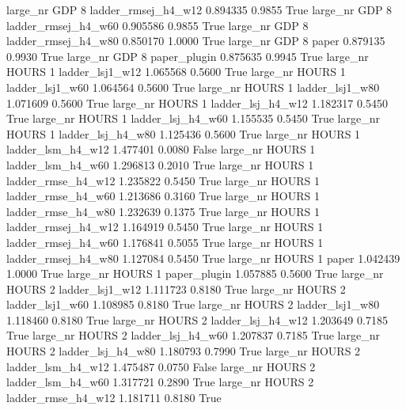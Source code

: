   large_nr      GDP                 8 ladder_rmsej_h4_w12   0.894335      0.9855    True
  large_nr      GDP                 8 ladder_rmsej_h4_w60   0.905586      0.9855    True
  large_nr      GDP                 8 ladder_rmsej_h4_w80   0.850170      1.0000    True
  large_nr      GDP                 8               paper   0.879135      0.9930    True
  large_nr      GDP                 8        paper_plugin   0.875635      0.9945    True
  large_nr    HOURS                 1     ladder_lsj1_w12   1.065568      0.5600    True
  large_nr    HOURS                 1     ladder_lsj1_w60   1.064564      0.5600    True
  large_nr    HOURS                 1     ladder_lsj1_w80   1.071609      0.5600    True
  large_nr    HOURS                 1   ladder_lsj_h4_w12   1.182317      0.5450    True
  large_nr    HOURS                 1   ladder_lsj_h4_w60   1.155535      0.5450    True
  large_nr    HOURS                 1   ladder_lsj_h4_w80   1.125436      0.5600    True
  large_nr    HOURS                 1   ladder_lsm_h4_w12   1.477401      0.0080   False
  large_nr    HOURS                 1   ladder_lsm_h4_w60   1.296813      0.2010    True
  large_nr    HOURS                 1  ladder_rmse_h4_w12   1.235822      0.5450    True
  large_nr    HOURS                 1  ladder_rmse_h4_w60   1.213686      0.3160    True
  large_nr    HOURS                 1  ladder_rmse_h4_w80   1.232639      0.1375    True
  large_nr    HOURS                 1 ladder_rmsej_h4_w12   1.164919      0.5450    True
  large_nr    HOURS                 1 ladder_rmsej_h4_w60   1.176841      0.5055    True
  large_nr    HOURS                 1 ladder_rmsej_h4_w80   1.127084      0.5450    True
  large_nr    HOURS                 1               paper   1.042439      1.0000    True
  large_nr    HOURS                 1        paper_plugin   1.057885      0.5600    True
  large_nr    HOURS                 2     ladder_lsj1_w12   1.111723      0.8180    True
  large_nr    HOURS                 2     ladder_lsj1_w60   1.108985      0.8180    True
  large_nr    HOURS                 2     ladder_lsj1_w80   1.118460      0.8180    True
  large_nr    HOURS                 2   ladder_lsj_h4_w12   1.203649      0.7185    True
  large_nr    HOURS                 2   ladder_lsj_h4_w60   1.207837      0.7185    True
  large_nr    HOURS                 2   ladder_lsj_h4_w80   1.180793      0.7990    True
  large_nr    HOURS                 2   ladder_lsm_h4_w12   1.475487      0.0750   False
  large_nr    HOURS                 2   ladder_lsm_h4_w60   1.317721      0.2890    True
  large_nr    HOURS                 2  ladder_rmse_h4_w12   1.181711      0.8180    True
